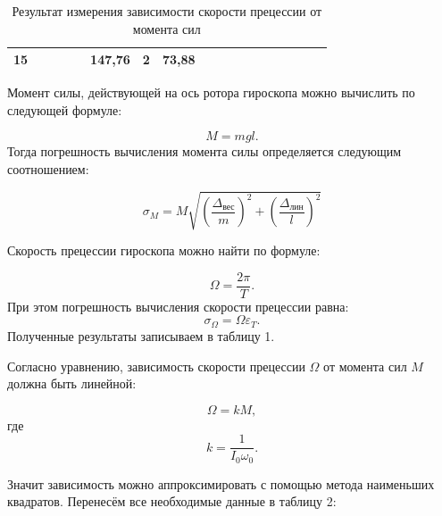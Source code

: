 \documentclass[a4paper,12pt]{article} %
\begin{document}
\begin{table}[H]
\begin{tabular}{|c|c|c|c|c|c|c|c|c|c|c|c|c|c|c|c|c|c|}
	15 &                        &                        &                        &                        & 147,76            & 2              & 73,88              &                        &                       &                        &                                           &                         \\ \hline
	\end{tabular}
	\caption{Результат измерения зависимости скорости прецессии от момента сил}
	\label{sk_pre}
\end{table}

Момент силы, действующей на ось ротора гироскопа можно вычислить по следующей формуле:

\begin{equation}
M = mgl.
\end{equation}
Тогда погрешность вычисления момента силы определяется следующим соотношением:

\begin{equation}
\sigma_M = M\sqrt{\left( \frac{\Delta_\text{вес}}{m} \right)^2 + \left( \frac{\Delta_\text{лин}}{l} \right)^2}
\end{equation}

Скорость прецессии гироскопа можно найти по формуле:

\begin{equation}
\Omega = \frac{2\pi}{T}.
\end{equation}
При этом погрешность вычисления скорости прецессии равна:
\begin{equation}
\sigma_\Omega = \Omega \varepsilon_T.
\end{equation}
Полученные результаты записываем в таблицу 1.

Согласно уравнению, зависимость скорости прецессии $ \Omega $ от момента сил $ M $ должна быть линейной:

\begin{equation}
\Omega = kM,
\end{equation}
где
\begin{equation}
k = \frac{1}{I_0\omega_0}.
\end{equation}

Значит зависимость можно аппроксимировать с помощью метода наименьших квадратов. Перенесём все необходимые данные в таблицу 2:
\end{document}
